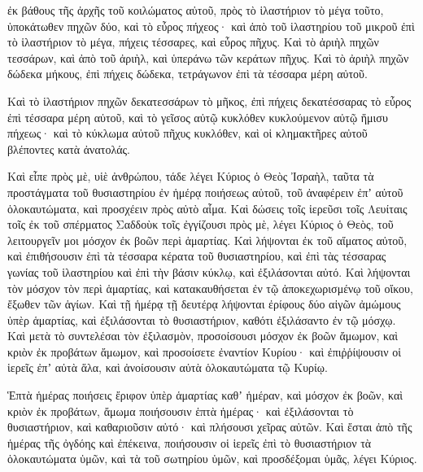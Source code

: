 {ἐκ βάθους τῆς ἀρχῆς τοῦ κοιλώματος αὐτοῦ, πρὸς τὸ ἱλαστήριον τὸ μέγα τοῦτο, ὑποκάτωθεν πηχῶν δύο, καὶ τὸ εὖρος πήχεος· καὶ ἀπὸ τοῦ ἱλαστηρίου τοῦ μικροῦ ἐπὶ τὸ ἱλαστήριον τὸ μέγα, πήχεις τέσσαρες, καὶ εὖρος πῆχυς.
Καὶ τὸ ἀριὴλ πηχῶν τεσσάρων, καὶ ἀπὸ τοῦ ἀριὴλ, καὶ ὑπεράνω τῶν κεράτων πῆχυς.
Καὶ τὸ ἀριὴλ πηχῶν δώδεκα μήκους, ἐπὶ πήχεις δώδεκα, τετράγωνον ἐπὶ τὰ τέσσαρα μέρη αὐτοῦ.
\par }{\PP {}Καὶ τὸ ἱλαστήριον πηχῶν δεκατεσσάρων τὸ μῆκος, ἐπὶ πήχεις δεκατέσσαρας τὸ εὖρος ἐπὶ τέσσαρα μέρη αὐτοῦ, καὶ τὸ γεῖσος αὐτῷ κυκλόθεν κυκλούμενον αὐτῷ ἥμισυ πήχεως· καὶ τὸ κύκλωμα αὐτοῦ πῆχυς κυκλόθεν, καὶ οἱ κλημακτῆρες αὐτοῦ βλέποντες κατὰ ἀνατολάς.
\par }{\PP {}Καὶ εἶπε πρὸς μὲ, υἱὲ ἀνθρώπου, τάδε λέγει Κύριος ὁ Θεὸς Ἰσραὴλ, ταῦτα τὰ προστάγματα τοῦ θυσιαστηρίου ἐν ἡμέρᾳ ποιήσεως αὐτοῦ, τοῦ ἀναφέρειν ἐπʼ αὐτοῦ ὁλοκαυτώματα, καὶ προσχέειν πρὸς αὐτὸ αἷμα.
Καὶ δώσεις τοῖς ἱερεῦσι τοῖς Λευίταις τοῖς ἐκ τοῦ σπέρματος Σαδδοὺκ τοῖς ἐγγίζουσι πρὸς μὲ, λέγει Κύριος ὁ Θεὸς, τοῦ λειτουργεῖν μοι μόσχον ἐκ βοῶν περὶ ἁμαρτίας.
Καὶ λήψονται ἐκ τοῦ αἵματος αὐτοῦ, καὶ ἐπιθήσουσιν ἐπὶ τὰ τέσσαρα κέρατα τοῦ θυσιαστηρίου, καὶ ἐπὶ τὰς τέσσαρας γωνίας τοῦ ἱλαστηρίου καὶ ἐπὶ τὴν βάσιν κύκλῳ, καὶ ἐξιλάσονται αὐτό.
Καὶ λήψονται τὸν μόσχον τὸν περὶ ἁμαρτίας, καὶ κατακαυθήσεται ἐν τῷ ἀποκεχωρισμένῳ τοῦ οἴκου, ἔξωθεν τῶν ἁγίων.
Καὶ τῇ ἡμέρᾳ τῇ δευτέρᾳ λήψονται ἐρίφους δύο αἰγῶν ἀμώμους ὑπὲρ ἁμαρτίας, καὶ ἐξιλάσονται τὸ θυσιαστήριον, καθότι ἐξιλάσαντο ἐν τῷ μόσχῳ.
Καὶ μετὰ τὸ συντελέσαι τὸν ἐξιλασμὸν, προσοίσουσι μόσχον ἐκ βοῶν ἄμωμον, καὶ κριὸν ἐκ προβάτων ἄμωμον,
καὶ προσοίσετε ἐναντίον Κυρίου· καὶ ἐπιῤῥίψουσιν οἱ ἱερεῖς ἐπʼ αὐτὰ ἅλα, καὶ ἀνοίσουσιν αὐτὰ ὁλοκαυτώματα τῷ Κυρίῳ.
\par }{\PP {}Ἑπτὰ ἡμέρας ποιήσεις ἔριφον ὑπὲρ ἁμαρτίας καθʼ ἡμέραν, καὶ μόσχον ἐκ βοῶν, καὶ κριὸν ἐκ προβάτων, ἄμωμα ποιήσουσιν
ἑπτὰ ἡμέρας· καὶ ἐξιλάσονται τὸ θυσιαστήριον, καὶ καθαριοῦσιν αὐτό· καὶ πλήσουσι χεῖρας αὐτῶν.
Καὶ ἔσται ἀπὸ τῆς ἡμέρας τῆς ὀγδόης καὶ ἐπέκεινα, ποιήσουσιν οἱ ἱερεῖς ἐπὶ τὸ θυσιαστήριον τὰ ὁλοκαυτώματα ὑμῶν, καὶ τὰ τοῦ σωτηρίου ὑμῶν, καὶ προσδέξομαι ὑμᾶς, λέγει Κύριος.

}
